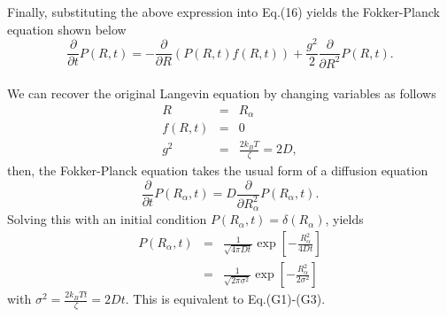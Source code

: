 \documentclass[a4paper,11pt]{article}
\begin{document}
Finally, substituting the above expression into Eq.(16) yields the Fokker-Planck equation shown below
\begin{equation}
\frac{\partial}{\partial t}P(R,t)=-\frac{\partial}{\partial  R}\left(P(R,t)f(R,t)\right)
+\frac{g^2}{2}\frac{\partial}{\partial R^2}P(R,t).
\end{equation}
\\
We can recover the original Langevin equation by changing variables as follows
\begin{eqnarray}
R&=&R_\alpha\\
f(R,t)&=&0\\
g^2&=&\frac{2k_BT}{\zeta}=2D,
\end{eqnarray}
then, the Fokker-Planck equation takes the usual form of a diffusion equation
\begin{equation}
\frac{\partial}{\partial t}P(R_\alpha,t)=
D\frac{\partial}{\partial R_\alpha^2}P(R_\alpha,t).
\end{equation}
Solving this with an initial condition $P(R_\alpha,t)=\delta(R_\alpha)$, yields 
\begin{eqnarray}
  P(R_\alpha,t)&=&\frac{1}{\sqrt{4\pi Dt}}\exp\left[-\frac{R_\alpha^2}{4Dt}\right]\\
  &=&\frac{1}{\sqrt{2\pi \sigma^2}}\exp\left[-\frac{R_\alpha^2}{2\sigma^2}\right]
\end{eqnarray}
with $\sigma^2=\frac{2k_BT t}{\zeta}=2Dt$.
This is equivalent to Eq.(G1)-(G3).
\end{document}
